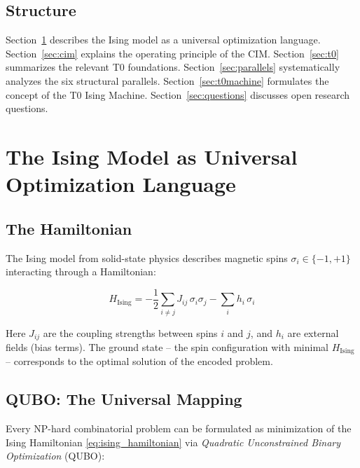 \subsection{Structure}

Section~\ref{sec:ising} describes the Ising model as a universal optimization language.
Section~\ref{sec:cim} explains the operating principle of the CIM.
Section~\ref{sec:t0} summarizes the relevant T0 foundations.
Section~\ref{sec:parallels} systematically analyzes the six structural parallels.
Section~\ref{sec:t0machine} formulates the concept of the T0 Ising Machine.
Section~\ref{sec:questions} discusses open research questions.

\clearpage

\section{The Ising Model as Universal Optimization Language}
\label{sec:ising}

\subsection{The Hamiltonian}

The Ising model from solid-state physics describes magnetic spins
$\sigma_i \in \{-1, +1\}$ interacting through a Hamiltonian:

\begin{equation}
    H_{\text{Ising}} = -\frac{1}{2} \sum_{i \neq j} J_{ij} \, \sigma_i \sigma_j
    - \sum_{i} h_i \, \sigma_i
    \label{eq:ising_hamiltonian}
\end{equation}

Here $J_{ij}$ are the coupling strengths between spins $i$ and $j$, and $h_i$ are
external fields (bias terms). The ground state -- the spin configuration with minimal
$H_{\text{Ising}}$ -- corresponds to the optimal solution of the encoded problem.

\subsection{QUBO: The Universal Mapping}

Every NP-hard combinatorial problem can be formulated as minimization of the Ising
Hamiltonian \eqref{eq:ising_hamiltonian} via \emph{Quadratic Unconstrained Binary
Optimization} (QUBO):


